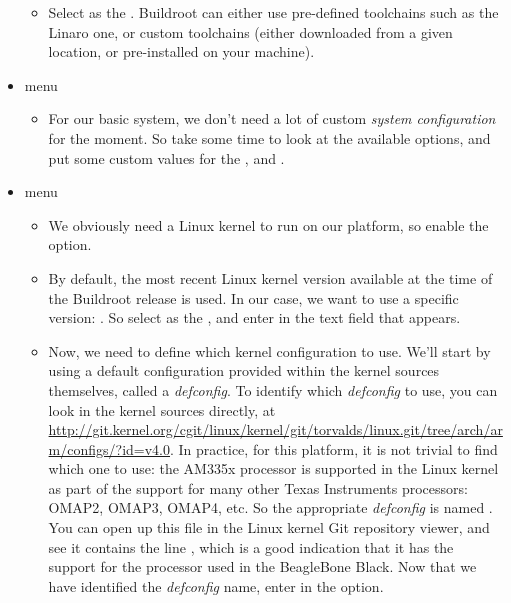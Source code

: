 \begin{itemize}
\begin{itemize}
  \item Select  as the
    . Buildroot can either use pre-defined toolchains
    such as the Linaro one, or custom toolchains (either downloaded
    from a given location, or pre-installed on your machine).

  \end{itemize}

\item {} menu

  \begin{itemize}

  \item For our basic system, we don't need a lot of custom {\em
      system configuration} for the moment. So take some time to look
    at the available options, and put some custom values for the
    ,  and .

  \end{itemize}

\item {} menu

  \begin{itemize}

  \item We obviously need a Linux kernel to run on our platform, so
    enable the  option.

  \item By default, the most recent Linux kernel version available at
    the time of the Buildroot release is used. In our case, we want to
    use a specific version: . So select  as the , and enter  in
    the  text field that appears.

  \item Now, we need to define which kernel configuration to
    use. We'll start by using a default configuration provided within
    the kernel sources themselves, called a {\em defconfig}. To
    identify which {\em defconfig} to use, you can look in the kernel
    sources directly, at
    \url{http://git.kernel.org/cgit/linux/kernel/git/torvalds/linux.git/tree/arch/arm/configs/?id=v4.0}. In
    practice, for this platform, it is not trivial to find which one
    to use: the AM335x processor is supported in the Linux kernel as
    part of the support for many other Texas Instruments processors:
    OMAP2, OMAP3, OMAP4, etc. So the appropriate {\em defconfig} is
    named . You can open up this file in the
    Linux kernel Git repository viewer, and see it contains the line
    , which is a good indication that it has
    the support for the processor used in the BeagleBone Black. Now
    that we have identified the {\em defconfig} name, enter
     in the  option.


\end{itemize}
\end{itemize}
